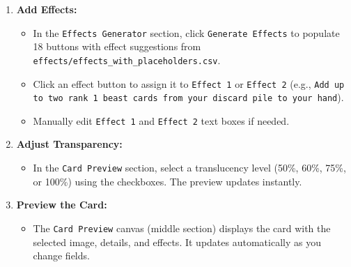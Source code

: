 \begin{enumerate}
    \item \textbf{Add Effects:}
          \begin{itemize}
              \item In the \texttt{Effects Generator} section, click \texttt{Generate Effects} to populate 18 buttons with effect suggestions from \texttt{effects/effects\_with\_placeholders.csv}.
              \item Click an effect button to assign it to \texttt{Effect 1} or \texttt{Effect 2} (e.g., \texttt{Add up to two rank 1 beast cards from your discard pile to your hand}).
              \item Manually edit \texttt{Effect 1} and \texttt{Effect 2} text boxes if needed.
          \end{itemize}

    \item \textbf{Adjust Transparency:}
          \begin{itemize}
              \item In the \texttt{Card Preview} section, select a translucency level (50\%, 60\%, 75\%, or 100\%) using the checkboxes. The preview updates instantly.
          \end{itemize}

    \item \textbf{Preview the Card:}
          \begin{itemize}
              \item The \texttt{Card Preview} canvas (middle section) displays the card with the selected image, details, and effects. It updates automatically as you change fields.
          \end{itemize}


\end{enumerate}
